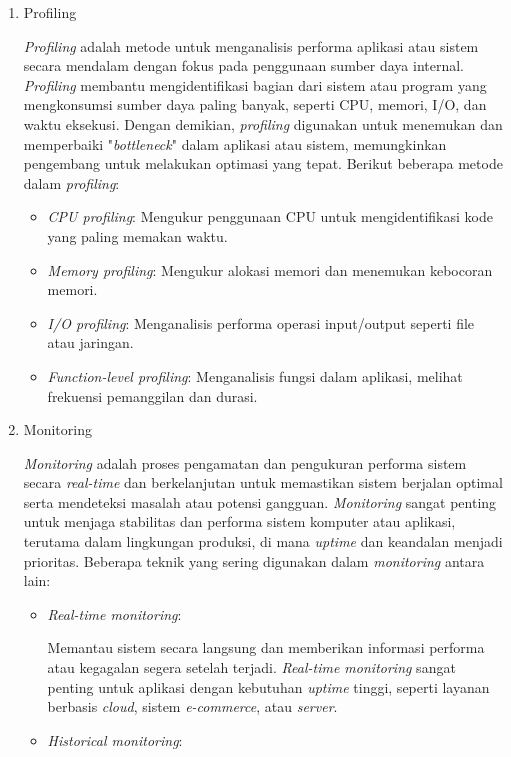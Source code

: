 \documentclass[12pt]{article}
\begin{document}
\begin{enumerate}
\begin{enumerate}
\begin{itemize}
    \end{itemize}  
    \item Profiling
    \par \textit{Profiling} adalah metode untuk menganalisis performa aplikasi atau sistem secara mendalam dengan fokus pada penggunaan sumber daya internal. \textit{Profiling} membantu mengidentifikasi bagian dari sistem atau program yang mengkonsumsi sumber daya paling banyak, seperti CPU, memori, I/O, dan waktu eksekusi. Dengan demikian, \textit{profiling} digunakan untuk menemukan dan memperbaiki "\textit{bottleneck}" dalam aplikasi atau sistem, memungkinkan pengembang untuk melakukan optimasi yang tepat. Berikut beberapa metode dalam \textit{profiling}:
    \begin{itemize}
        \item \textit{CPU profiling}: Mengukur penggunaan CPU untuk mengidentifikasi kode yang paling memakan waktu.
        \item \textit{Memory profiling}: Mengukur alokasi memori dan menemukan kebocoran memori. 
        \item \textit{I/O profiling}: Menganalisis performa operasi input/output seperti file atau jaringan.
        \item \textit{Function-level profiling}: Menganalisis fungsi dalam aplikasi, melihat frekuensi pemanggilan dan durasi.
    \end{itemize}
    \item Monitoring
    \par \textit{Monitoring} adalah proses pengamatan dan pengukuran performa sistem secara \textit{real-time} dan berkelanjutan untuk memastikan sistem berjalan optimal serta mendeteksi masalah atau potensi gangguan. \textit{Monitoring} sangat penting untuk menjaga stabilitas dan performa sistem komputer atau aplikasi, terutama dalam lingkungan produksi, di mana \textit{uptime} dan keandalan menjadi prioritas. Beberapa teknik yang sering digunakan dalam \textit{monitoring} antara lain:
    \begin{itemize}
        \item \textit{Real-time monitoring}:
        \par Memantau sistem secara langsung dan memberikan informasi performa atau kegagalan segera setelah terjadi. \textit{Real-time monitoring} sangat penting untuk aplikasi dengan kebutuhan \textit{uptime} tinggi, seperti layanan berbasis \textit{cloud}, sistem \textit{e-commerce}, atau \textit{server}.
        \item \textit{Historical monitoring}:

\end{itemize}
\end{enumerate}
\end{enumerate}
\end{document}

